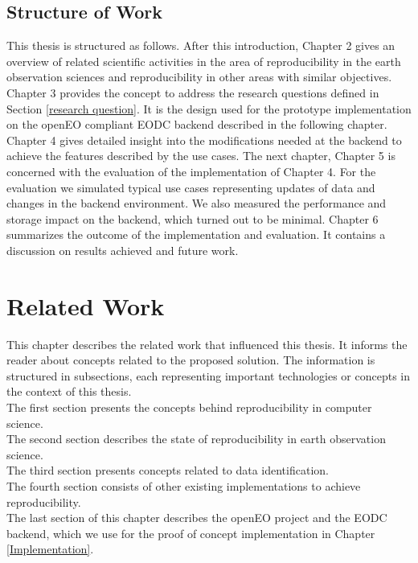 \documentclass[draft,final]{vutinfth} %
\begin{document}
\section{Structure of Work}\label{Structure}
This thesis is structured as follows. After this introduction, Chapter 2 gives an overview of related scientific activities in the area of reproducibility in the earth observation sciences and reproducibility in other areas with similar objectives. Chapter 3 provides the concept to address the research questions defined in Section \ref{research question}. It is the design used for the prototype implementation on the openEO compliant EODC backend described in the following chapter. Chapter 4 gives detailed insight into the modifications needed at the backend to achieve the features described by the use cases. The next chapter, Chapter 5 is concerned with the evaluation of the implementation of Chapter 4. For the evaluation we simulated typical use cases representing updates of data and changes in the backend environment. We also measured the performance and storage impact on the backend, which turned out to be minimal. 
Chapter 6 summarizes the outcome of the implementation and evaluation. It contains a discussion on results achieved and future work. 

\chapter{Related Work}\label{Related Work}


This chapter describes the related work that influenced this thesis. It informs the reader about concepts related to the proposed solution. The information is structured in subsections, each representing important technologies or concepts in the context of this thesis. \\The first section presents the concepts behind reproducibility in computer science. \\
The second section describes the state of reproducibility in earth observation science. \\
The third section presents concepts related to data identification. \\ 
The fourth section consists of other existing implementations to achieve reproducibility. \\
The last section of this chapter describes the openEO project and the EODC backend, which we use for the proof of concept implementation in Chapter \ref{Implementation}.      
\end{document}
